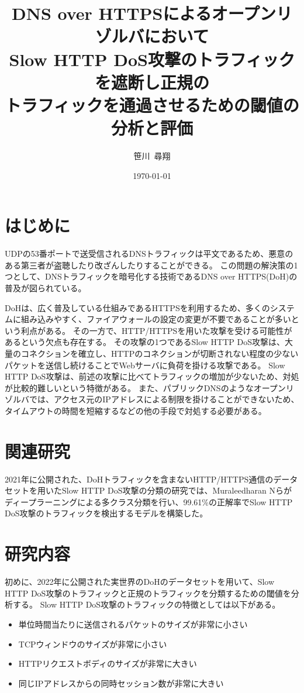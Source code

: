 \documentclass[twocolumn,article]{jlreq}
\title{DNS over HTTPSによるオープンリゾルバにおいて\\Slow HTTP DoS攻撃のトラフィックを遮断し正規の\\トラフィックを通過させるための閾値の分析と評価}
\author{笹川~尋翔}
\date{\today}
\begin{document}
\maketitle

\section{はじめに}\label{sec:intro}
UDPの53番ポートで送受信されるDNSトラフィックは平文であるため、悪意のある第三者が盗聴したり改ざんしたりすることができる。%
この問題の解決策の1つとして、DNSトラフィックを暗号化する技術であるDNS over HTTPS(DoH)の普及が図られている。%

DoHは、広く普及している仕組みであるHTTPSを利用するため、多くのシステムに組み込みやすく、ファイアウォールの設定の変更が不要であることが多いという利点がある。%
その一方で、HTTP/HTTPSを用いた攻撃を受ける可能性があるという欠点も存在する。%
その攻撃の1つであるSlow HTTP DoS攻撃は、大量のコネクションを確立し、HTTPのコネクションが切断されない程度の少ないパケットを送信し続けることでWebサーバに負荷を掛ける攻撃である。%
Slow HTTP DoS攻撃は、前述の攻撃に比べてトラフィックの増加が少ないため、対処が比較的難しいという特徴がある。%
また、パブリックDNSのようなオープンリゾルバでは、アクセス元のIPアドレスによる制限を掛けることができないため、タイムアウトの時間を短縮するなどの他の手段で対処する必要がある。

\section{関連研究}\label{sec:relation}
2021年に公開された、DoHトラフィックを含まないHTTP/HTTPS通信のデータセットを用いたSlow HTTP DoS攻撃の分類の研究\cite{Muraleedharan2021}では、Muraleedharan Nらがディープラーニングによる多クラス分類を行い、99.61\%の正解率でSlow HTTP DoS攻撃のトラフィックを検出するモデルを構築した。


\section{研究内容}
初めに、2022年に公開された実世界のDoHのデータセット\cite{Jerabek2022}を用いて、Slow HTTP DoS攻撃のトラフィックと正規のトラフィックを分類するための閾値を分析する。%
Slow HTTP DoS攻撃のトラフィックの特徴としては以下がある。%

\begin{itemize}
  \item 単位時間当たりに送信されるパケットのサイズが非常に小さい
  \item TCPウィンドウのサイズが非常に小さい
  \item HTTPリクエストボディのサイズが非常に大きい
  \item 同じIPアドレスからの同時セッション数が非常に大きい
\end{itemize}
\end{document}

